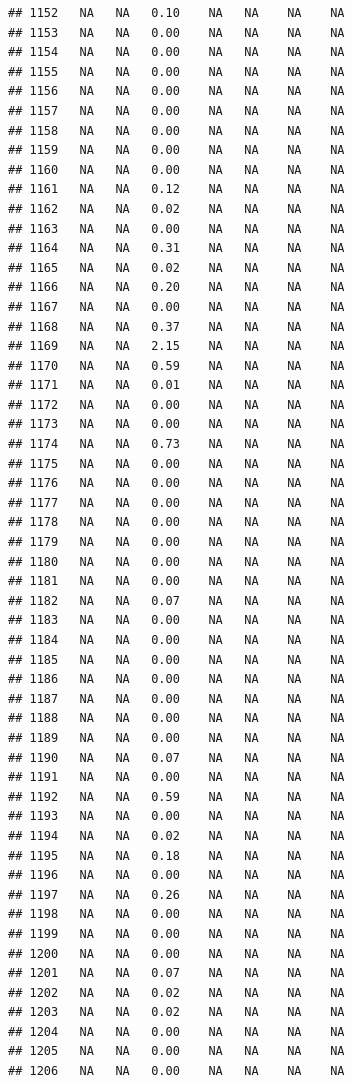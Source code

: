 \documentclass{article}\usepackage{graphicx, color}
\makeatletter
\newenvironment{kframe}{%
 \def\at@end@of@kframe{}%
 \ifinner\ifhmode%
  \def\at@end@of@kframe{\end{minipage}}%
  \begin{minipage}{\columnwidth}%
 \fi\fi%
 \def\FrameCommand##1{\hskip\@totalleftmargin \hskip-\fboxsep
 \colorbox{shadecolor}{##1}\hskip-\fboxsep
     \hskip-\linewidth \hskip-\@totalleftmargin \hskip\columnwidth}%
 \MakeFramed {\advance\hsize-\width
   \@totalleftmargin\z@ \linewidth\hsize
   \@setminipage}}%
 {\par\unskip\endMakeFramed%
 \at@end@of@kframe}
\newenvironment{knitrout}{}{} %
\makeatother
\begin{document}
\begin{knitrout}
\begin{kframe}
\begin{verbatim}
## 1152   NA   NA   0.10    NA   NA    NA    NA
## 1153   NA   NA   0.00    NA   NA    NA    NA
## 1154   NA   NA   0.00    NA   NA    NA    NA
## 1155   NA   NA   0.00    NA   NA    NA    NA
## 1156   NA   NA   0.00    NA   NA    NA    NA
## 1157   NA   NA   0.00    NA   NA    NA    NA
## 1158   NA   NA   0.00    NA   NA    NA    NA
## 1159   NA   NA   0.00    NA   NA    NA    NA
## 1160   NA   NA   0.00    NA   NA    NA    NA
## 1161   NA   NA   0.12    NA   NA    NA    NA
## 1162   NA   NA   0.02    NA   NA    NA    NA
## 1163   NA   NA   0.00    NA   NA    NA    NA
## 1164   NA   NA   0.31    NA   NA    NA    NA
## 1165   NA   NA   0.02    NA   NA    NA    NA
## 1166   NA   NA   0.20    NA   NA    NA    NA
## 1167   NA   NA   0.00    NA   NA    NA    NA
## 1168   NA   NA   0.37    NA   NA    NA    NA
## 1169   NA   NA   2.15    NA   NA    NA    NA
## 1170   NA   NA   0.59    NA   NA    NA    NA
## 1171   NA   NA   0.01    NA   NA    NA    NA
## 1172   NA   NA   0.00    NA   NA    NA    NA
## 1173   NA   NA   0.00    NA   NA    NA    NA
## 1174   NA   NA   0.73    NA   NA    NA    NA
## 1175   NA   NA   0.00    NA   NA    NA    NA
## 1176   NA   NA   0.00    NA   NA    NA    NA
## 1177   NA   NA   0.00    NA   NA    NA    NA
## 1178   NA   NA   0.00    NA   NA    NA    NA
## 1179   NA   NA   0.00    NA   NA    NA    NA
## 1180   NA   NA   0.00    NA   NA    NA    NA
## 1181   NA   NA   0.00    NA   NA    NA    NA
## 1182   NA   NA   0.07    NA   NA    NA    NA
## 1183   NA   NA   0.00    NA   NA    NA    NA
## 1184   NA   NA   0.00    NA   NA    NA    NA
## 1185   NA   NA   0.00    NA   NA    NA    NA
## 1186   NA   NA   0.00    NA   NA    NA    NA
## 1187   NA   NA   0.00    NA   NA    NA    NA
## 1188   NA   NA   0.00    NA   NA    NA    NA
## 1189   NA   NA   0.00    NA   NA    NA    NA
## 1190   NA   NA   0.07    NA   NA    NA    NA
## 1191   NA   NA   0.00    NA   NA    NA    NA
## 1192   NA   NA   0.59    NA   NA    NA    NA
## 1193   NA   NA   0.00    NA   NA    NA    NA
## 1194   NA   NA   0.02    NA   NA    NA    NA
## 1195   NA   NA   0.18    NA   NA    NA    NA
## 1196   NA   NA   0.00    NA   NA    NA    NA
## 1197   NA   NA   0.26    NA   NA    NA    NA
## 1198   NA   NA   0.00    NA   NA    NA    NA
## 1199   NA   NA   0.00    NA   NA    NA    NA
## 1200   NA   NA   0.00    NA   NA    NA    NA
## 1201   NA   NA   0.07    NA   NA    NA    NA
## 1202   NA   NA   0.02    NA   NA    NA    NA
## 1203   NA   NA   0.02    NA   NA    NA    NA
## 1204   NA   NA   0.00    NA   NA    NA    NA
## 1205   NA   NA   0.00    NA   NA    NA    NA
## 1206   NA   NA   0.00    NA   NA    NA    NA

\end{verbatim}
\end{kframe}
\end{knitrout}
\end{document}
